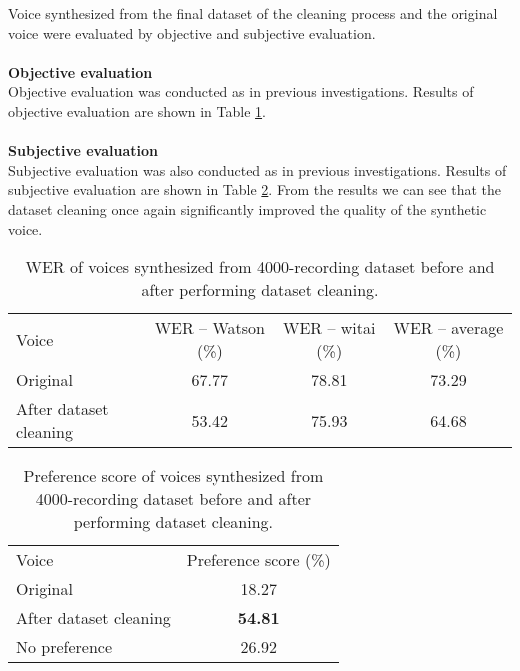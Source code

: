 \documentclass[12pt]{article}
\begin{document}
Voice synthesized from the final dataset of the cleaning process and the original voice were evaluated by objective and subjective evaluation.\\\\
\textbf{Objective evaluation}
\vspace{0.28cm}\\
Objective evaluation was conducted as in previous investigations. Results of objective evaluation are shown in Table \ref{tab_werCombination4000}.\\\\
\textbf{Subjective evaluation}
\vspace{0.28cm}\\
Subjective evaluation was also conducted as in previous investigations. Results of subjective evaluation are shown in Table \ref{tab_subEvaCombination4000}. From the results we can see that the dataset cleaning once again significantly improved the quality of the synthetic voice.

\begin{table}[]
\begin{center}
\caption{WER of voices synthesized from 4000-recording dataset before and after performing dataset cleaning.}
\label{tab_werCombination4000}
\vspace{3mm}
\begin{tabular}{lccc}
\hline
Voice & WER – Watson (\%) & WER – witai (\%) & WER – average (\%)\\
\cmidrule(l{0pt}r{2pt}){1-1}\cmidrule(l{0pt}r{2pt}){2-2}\cmidrule(l{0pt}r{2pt}){3-3}\cmidrule(l{0pt}r{2pt}){4-4}
Original            & 67.77 & 78.81 & 73.29 \\
After dataset cleaning & 53.42 & 75.93 & 64.68 \\
\hline
\end{tabular}
\end{center}
\end{table}

\begin{table}[]
\begin{center}
\caption{Preference score of voices synthesized from 4000-recording dataset before and after performing dataset cleaning.}
\label{tab_subEvaCombination4000}
\vspace{3mm}
\begin{tabular}{lc}
\hline
Voice & Preference score (\%) \\
\cmidrule(l{0pt}r{2pt}){1-1}\cmidrule(l{0pt}r{2pt}){2-2}
Original                & 18.27 \\
After dataset cleaning  & \textbf{54.81} \\
No preference           & 26.92 \\
\hline
\end{tabular}
\end{center}
\end{table}
\end{document}
